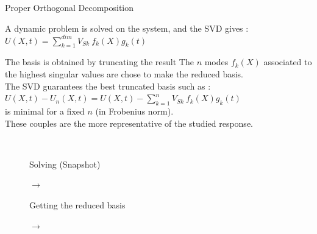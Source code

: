 \documentclass[12pt]{beamer}
\newcommand\FontPOD{\fontsize{10}{12}\selectfont}
\begin{document}
\begin{frame}{Proper Orthogonal Decomposition}
	\FontPOD
	\begin{alertblock}{A dynamic problem is solved on the system, and the SVD gives :}
	$ \displaystyle U(X,t) = \sum_{k=1}^{dim} V_{Sk}~f_k(X) g_k(t)$\\
	\end{alertblock}
		
	\begin{alertblock}{The basis is obtained by truncating the result}
	The $n$ modes $f_k(X)$ associated to the highest 
	singular values are chose to make the reduced basis.\\
	The SVD guarantees the best truncated basis such as :
	$ \displaystyle U(X,t) - U_n(X,t) = U(X,t) - \sum_{k=1}^{n} V_{Sk}~ f_k(X) g_k(t)$\\
	is minimal for a fixed $n$ (in Frobenius norm).\\
	These couples are the more representative of the studied response.
	\end{alertblock}
	\vspace{-0.3cm}
	\begin{figure}
	$~$
	   \begin{minipage}{0.19\linewidth}
			\begin{alertblock}{}
				\centering		
				Solving (Snapshot)
			\end{alertblock}
	   \end{minipage}\hfill
	   \begin{minipage}{0.03\linewidth}
			\vspace{0.220cm}
	   		$\!\!\rightarrow$
	   \end{minipage}\hfill
	   \begin{minipage}{0.19\linewidth}
			\begin{alertblock}{}
				\centering		
				Getting the reduced basis
			\end{alertblock}
	   \end{minipage}
	   \begin{minipage}{0.03\linewidth}
			\vspace{0.220cm}
	   		$\!\!\!\rightarrow$
	   \end{minipage}\hfill
	   \begin{minipage}{0.19\linewidth}
			\begin{alertblock}{}
				\centering		

\end{alertblock}
\end{minipage}
\end{figure}
\end{frame}
\end{document}
